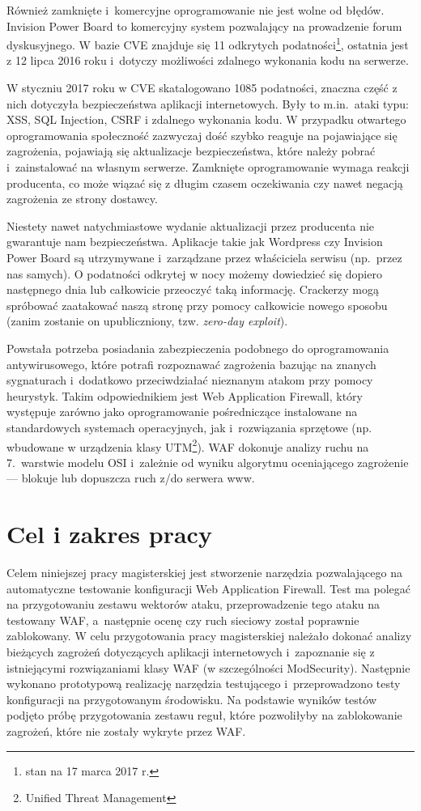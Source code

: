 \documentclass[11pt,a4paper,polish,thesis,oneside]{dcsbook}
\begin{document}
Również zamknięte i~komercyjne oprogramowanie nie jest wolne od błędów. Invision Power Board\cite{ipb} to komercyjny system pozwalający na prowadzenie forum dyskusyjnego. W bazie CVE znajduje się 11 odkrytych podatności\footnote{stan na 17 marca 2017 r.}, ostatnia jest z 12 lipca 2016 roku i~dotyczy możliwości zdalnego wykonania kodu na serwerze.

W styczniu 2017 roku w CVE skatalogowano 1085 podatności, znaczna część z nich dotyczyła bezpieczeństwa aplikacji internetowych. Były to m.in.\ ataki typu: XSS, SQL Injection, CSRF i zdalnego wykonania kodu. W przypadku otwartego oprogramowania społeczność zazwyczaj dość szybko reaguje na pojawiające się zagrożenia, pojawiają się aktualizacje bezpieczeństwa, które należy pobrać i~zainstalować na własnym serwerze. Zamknięte oprogramowanie wymaga reakcji producenta, co może wiązać się z długim czasem oczekiwania czy nawet negacją zagrożenia ze strony dostawcy.

Niestety nawet natychmiastowe wydanie aktualizacji przez producenta nie gwarantuje nam bezpieczeństwa. Aplikacje takie jak Wordpress czy Invision Power Board są utrzymywane i~zarządzane przez właściciela serwisu (np.\ przez nas samych). O podatności odkrytej w nocy możemy dowiedzieć się dopiero następnego dnia lub całkowicie przeoczyć taką informację. Crackerzy mogą spróbować zaatakować naszą stronę przy pomocy całkowicie nowego sposobu (zanim zostanie on upubliczniony, tzw. \textit{zero-day exploit}).

Powstała potrzeba posiadania zabezpieczenia podobnego do oprogramowania antywirusowego, które potrafi rozpoznawać zagrożenia bazując na znanych sygnaturach i~dodatkowo przeciwdziałać nieznanym atakom przy pomocy heurystyk. Takim odpowiednikiem jest Web Application Firewall, który występuje zarówno jako oprogramowanie pośredniczące instalowane na standardowych systemach operacyjnych, jak i~rozwiązania sprzętowe (np. wbudowane w urządzenia klasy UTM\footnote{Unified Threat Management}). WAF dokonuje analizy ruchu na 7.~warstwie modelu OSI i~zależnie od wyniku algorytmu oceniającego zagrożenie --- blokuje lub dopuszcza ruch z/do serwera www.  

\section*{Cel i zakres pracy}
Celem niniejszej pracy magisterskiej jest stworzenie narzędzia pozwalającego na automatyczne testowanie konfiguracji Web Application Firewall. Test ma polegać na przygotowaniu zestawu wektorów ataku, przeprowadzenie tego ataku na testowany WAF, a~następnie ocenę czy ruch sieciowy został poprawnie zablokowany. W celu przygotowania pracy magisterskiej należało dokonać analizy bieżących zagrożeń dotyczących aplikacji internetowych i~zapoznanie się z istniejącymi rozwiązaniami klasy WAF (w szczególności ModSecurity\cite{modsec}). Następnie wykonano prototypową realizację narzędzia testującego i~przeprowadzono testy konfiguracji na przygotowanym środowisku. Na podstawie wyników testów podjęto próbę przygotowania zestawu reguł, które pozwoliłyby na zablokowanie zagrożeń, które nie zostały wykryte przez WAF.
\end{document}
